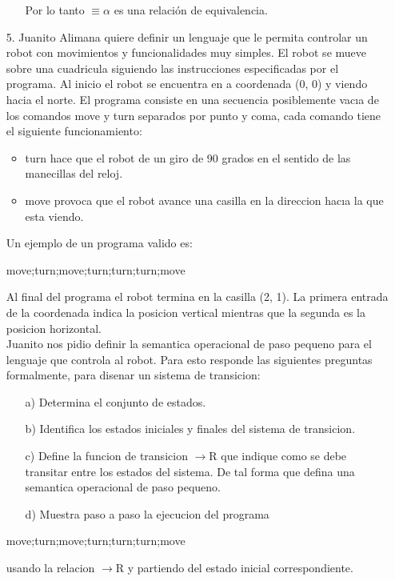 \documentclass{article}
\begin{document}
\begin{itemize}
\begin{itemize}
        Por lo tanto $\equiv\alpha$ es una relación de equivalencia.\\
            \end{itemize}
        \item[5.] Juanito Alimana quiere definir un lenguaje que le permita controlar un robot con movimientos y funcionalidades muy simples. El robot se mueve sobre una cuadricula siguiendo las instrucciones especificadas por el programa. Al inicio el robot se encuentra en a coordenada (0, 0) y viendo hacia el norte. El programa consiste en una secuencia posiblemente vacıa de los comandos move y turn separados por punto y coma, cada comando tiene el siguiente funcionamiento:
            \begin{itemize}
                \item turn hace que el robot de un giro de 90 grados en el sentido de las manecillas del reloj.
                \item move provoca que el robot avance una casilla en la direccion hacıa la que esta viendo.
            \end{itemize}
            Un ejemplo de un programa valido es:
            \begin{center}
                move;turn;move;turn;turn;turn;move
            \end{center}

            Al final del programa el robot termina en la casilla (2, 1). La primera entrada de la coordenada
            indica la posicion vertical mientras que la segunda es la posicion horizontal.\\ 
            Juanito nos pidio definir la semantica operacional de paso pequeno para el lenguaje que controla al robot. Para esto responde las siguientes preguntas formalmente, para disenar un sistema de transicion:
                \begin{itemize}
                    \item[a)] Determina el conjunto de estados.
                    \item[b)] Identifica los estados iniciales y finales del sistema de transicion.
                    \item[c)] Define la funcion de transicion $\rightarrow$R que indique como se debe transitar entre los estados del sistema. De tal forma que defina una semantica operacional de paso pequeno.
                    \item[d)] Muestra paso a paso la ejecucion del programa
                \end{itemize}
                \begin{center}
                    move;turn;move;turn;turn;turn;move
                \end{center}
            usando la relacion $\rightarrow$R y partiendo del estado inicial correspondiente.
    \end{itemize}
\end{document}
